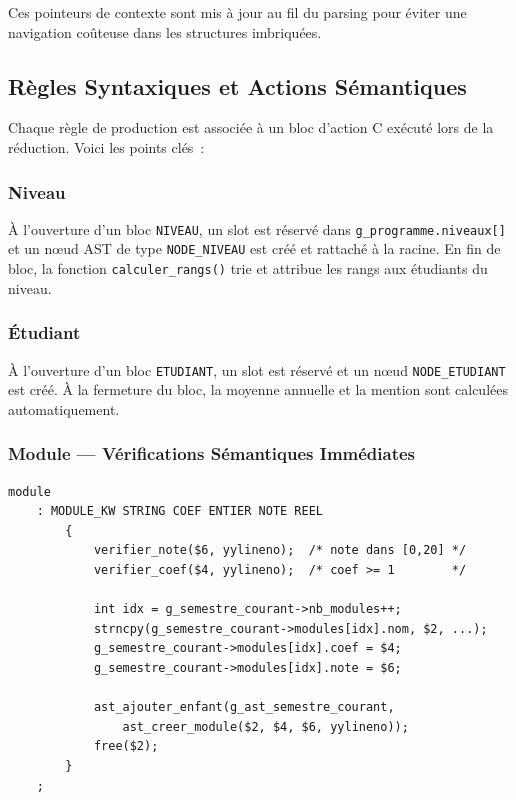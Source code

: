 \documentclass[a4paper,12pt]{article}
\begin{document}
Ces pointeurs de contexte sont mis à jour au fil du parsing pour éviter une navigation coûteuse dans les structures imbriquées.

\subsection{Règles Syntaxiques et Actions Sémantiques}

Chaque règle de production est associée à un bloc d'action C exécuté lors de la réduction. Voici les points clés~:

\subsubsection{Niveau}
À l'ouverture d'un bloc \texttt{NIVEAU}, un slot est réservé dans \texttt{g\_programme.niveaux[]} et un nœud AST de type \texttt{NODE\_NIVEAU} est créé et rattaché à la racine. En fin de bloc, la fonction \texttt{calculer\_rangs()} trie et attribue les rangs aux étudiants du niveau.

\subsubsection{Étudiant}
À l'ouverture d'un bloc \texttt{ETUDIANT}, un slot est réservé et un nœud \texttt{NODE\_ETUDIANT} est créé. À la fermeture du bloc, la moyenne annuelle et la mention sont calculées automatiquement.

\subsubsection{Module — Vérifications Sémantiques Immédiates}
\begin{lstlisting}[caption={Action sémantique d'un module}, style=bison, label=lst:module-sem]
module
    : MODULE_KW STRING COEF ENTIER NOTE REEL
        {
            verifier_note($6, yylineno);  /* note dans [0,20] */
            verifier_coef($4, yylineno);  /* coef >= 1        */

            int idx = g_semestre_courant->nb_modules++;
            strncpy(g_semestre_courant->modules[idx].nom, $2, ...);
            g_semestre_courant->modules[idx].coef = $4;
            g_semestre_courant->modules[idx].note = $6;

            ast_ajouter_enfant(g_ast_semestre_courant,
                ast_creer_module($2, $4, $6, yylineno));
            free($2);
        }
    ;
\end{lstlisting}
\end{document}
